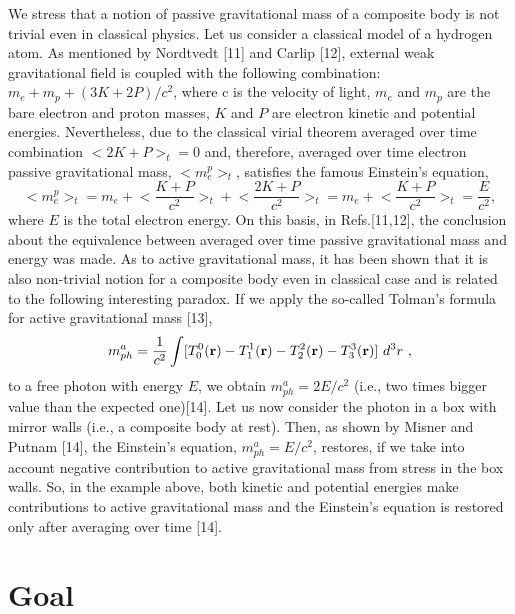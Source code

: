 \documentclass{ws-ijmpd}
\begin{document}
We stress that a notion of passive gravitational mass of a
composite body is not trivial even in classical physics. Let us
consider a classical model of a hydrogen atom. As mentioned by
Nordtvedt [11] and Carlip [12], external weak gravitational field
is coupled with the following combination: $m_e + m_p + (3K +
2P)/c^2$, where c is the velocity of light, $m_e$ and $m_p$ are
the bare electron and proton masses, $K$ and $P$ are electron
kinetic and potential energies. Nevertheless, due to the classical
virial theorem averaged over time combination $<2K + P>_t =0$ and,
therefore, averaged over time electron passive gravitational mass,
$<m^p_e>_t$, satisfies the famous Einstein's equation,
\begin{equation}
<m^p_e>_t = m_e + \biggl< \frac{K + P}{c^2} \biggl>_t + \biggl<
\frac{2K + P}{c^2} \biggl>_t = m_e + \biggl< \frac{K + P}{c^2}
\biggl>_t = \frac{E}{c^2},
\end{equation}
where $E$ is the total electron energy. On this basis, in
Refs.[11,12], the conclusion about the equivalence between
averaged over time passive gravitational mass and energy was made.
As to active gravitational mass, it has been shown that it is also
non-trivial notion for a composite body even in classical case and
is related to the following interesting paradox. If we
apply the so-called Tolman's formula for active gravitational mass
[13],
\begin{equation}
m_{ph}^a = \frac{1}{c^2} \int [T_0^0({\bf r}) - T_1^1({\bf r}) -
T_2^2({\bf r}) -T_3^3({\bf r})] \ d^3 r \ ,
\end{equation}
to a free photon with energy $E$, we obtain $m_{ph}^a = 2E/c^2$
(i.e., two times bigger value than the expected one)[14]. Let us
now consider the photon in a box with mirror walls (i.e., a
composite body at rest). Then, as shown by Misner and Putnam [14],
the Einstein's equation, $m^a_{ph}=E/c^2$, restores, if we take
into account negative contribution to active gravitational mass
from stress in the box walls. So, in the example above, both
kinetic and potential energies make contributions to active
gravitational mass and the Einstein's equation is restored only
after averaging over time [14].


\section{Goal}
\end{document}
